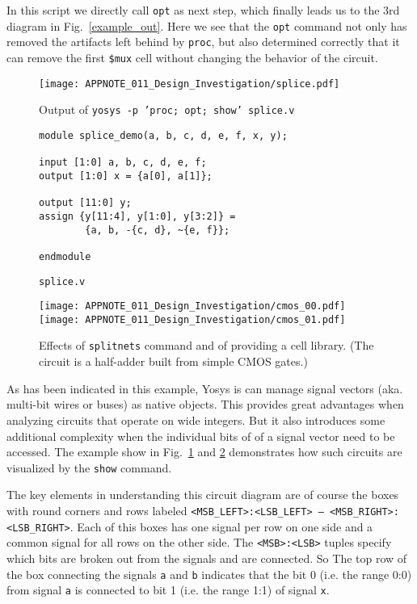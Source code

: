 \documentclass[9pt,technote,a4paper]{IEEEtran}
\begin{document}
\medskip

In this script we directly call {\tt opt} as next step, which finally leads us to
the 3rd diagram in Fig.~\ref{example_out}. Here we see that the {\tt opt} command
not only has removed the artifacts left behind by {\tt proc}, but also determined
correctly that it can remove the first {\tt \$mux} cell without changing the behavior
of the circuit.

\medskip

\begin{figure}[b!]
\texttt{[image: APPNOTE\_011\_Design\_Investigation/splice.pdf]}
\caption{Output of {\tt yosys -p 'proc; opt; show' splice.v}}
\label{splice_dia}
\end{figure}

\begin{figure}[b!]
\begin{lstlisting}
module splice_demo(a, b, c, d, e, f, x, y);

input [1:0] a, b, c, d, e, f;
output [1:0] x = {a[0], a[1]};

output [11:0] y;
assign {y[11:4], y[1:0], y[3:2]} =
		{a, b, -{c, d}, ~{e, f}};

endmodule
\end{lstlisting}
\caption{\tt splice.v}
\label{splice_src}
\end{figure}

\begin{figure}[t!]
\texttt{[image: APPNOTE\_011\_Design\_Investigation/cmos\_00.pdf]}
\texttt{[image: APPNOTE\_011\_Design\_Investigation/cmos\_01.pdf]}
\caption{Effects of {\tt splitnets} command and of providing a cell library. (The
circuit is a half-adder built from simple CMOS gates.)}
\label{splitnets_libfile}
\end{figure}

As has been indicated in this example, Yosys is can manage signal vectors (aka.
multi-bit wires or buses) as native objects. This provides great advantages
when analyzing circuits that operate on wide integers. But it also introduces
some additional complexity when the individual bits of of a signal vector need
to be accessed. The example show in Fig.~\ref{splice_dia} and \ref{splice_src}
demonstrates how such circuits are visualized by the {\tt show} command.

The key elements in understanding this circuit diagram are of course the boxes
with round corners and rows labeled {\tt <MSB\_LEFT>:<LSB\_LEFT> -- <MSB\_RIGHT>:<LSB\_RIGHT>}.
Each of this boxes has one signal per row on one side and a common signal for all rows on the
other side. The {\tt <MSB>:<LSB>} tuples specify which bits are broken out from the signals
and are connected. So The top row of the box connecting the signals {\tt a} and {\tt b} indicates
that the bit 0 (i.e. the range 0:0) from signal {\tt a} is connected to bit 1 (i.e. the range
1:1) of signal {\tt x}.
\end{document}
